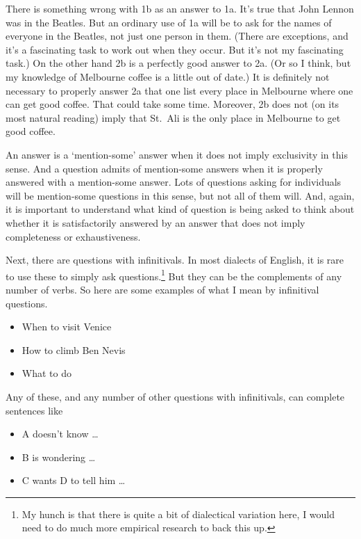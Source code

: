 \documentclass[11pt,]{book}
\providecommand{\tightlist}{%
  \setlength{\itemsep}{0pt}\setlength{\parskip}{0pt}}
\let\rmarkdownfootnote\footnote%
\def\footnote{\protect\rmarkdownfootnote}
\begin{document}
There is something wrong with 1b as an answer to 1a. It's true that John Lennon was in the Beatles. But an ordinary use of 1a will be to ask for the names of everyone in the Beatles, not just one person in them. (There are exceptions, and it's a fascinating task to work out when they occur. But it's not my fascinating task.) On the other hand 2b is a perfectly good answer to 2a. (Or so I think, but my knowledge of Melbourne coffee is a little out of date.) It is definitely not necessary to properly answer 2a that one list every place in Melbourne where one can get good coffee. That could take some time. Moreover, 2b does not (on its most natural reading) imply that St.~Ali is the only place in Melbourne to get good coffee.

An answer is a `mention-some' answer when it does not imply exclusivity in this sense. And a question admits of mention-some answers when it is properly answered with a mention-some answer. Lots of questions asking for individuals will be mention-some questions in this sense, but not all of them will. And, again, it is important to understand what kind of question is being asked to think about whether it is satisfactorily answered by an answer that does not imply completeness or exhaustiveness.

Next, there are questions with infinitivals. In most dialects of English, it is rare to use these to simply ask questions.\footnote{My hunch is that there is quite a bit of dialectical variation here, I would need to do much more empirical research to back this up.} But they can be the complements of any number of verbs. So here are some examples of what I mean by infinitival questions.

\begin{itemize}
\tightlist
\item
  When to visit Venice
\item
  How to climb Ben Nevis
\item
  What to do
\end{itemize}

Any of these, and any number of other questions with infinitivals, can complete sentences like

\begin{itemize}
\tightlist
\item
  A doesn't know \ldots{}
\item
  B is wondering \ldots{}
\item
  C wants D to tell him \ldots{}
\end{itemize}
\end{document}
